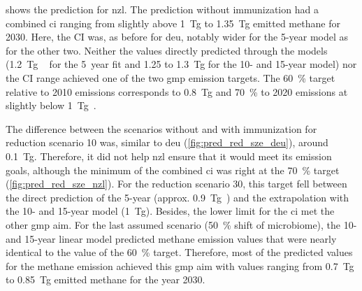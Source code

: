  shows the prediction for \acrshort{nzl}. The prediction without immunization had a combined \acrshort{ci} ranging from slightly above 1~Tg to 1.35~Tg emitted methane for 2030. Here, the CI was, as before for \acrshort{deu}, notably wider for the 5-year model as for the other two. Neither the values directly predicted through the models (1.2~Tg ~ for the 5~year fit and 1.25 to 1.3~Tg for the 10- and 15-year model) nor the CI range achieved one of the two \acrshort{gmp} emission targets. The 60~\% target relative to 2010 emissions corresponds to 0.8~Tg and 70~\% to 2020 emissions at slightly below 1~Tg~.

The difference between the scenarios without and with immunization for reduction scenario 10 was, similar to \acrshort{deu} (\cref{fig:pred_red_sze_deu}), around 0.1~Tg. Therefore, it did not help \acrshort{nzl} ensure that it would meet its emission goals, although the minimum of the combined \acrshort{ci} was right at the 70~\% target (\cref{fig:pred_red_sze_nzl}).
For the reduction scenario 30, this target fell between the direct prediction of the 5-year (approx. 0.9~Tg~) and the extrapolation with the 10- and 15-year model (1~Tg). Besides, the lower limit for the \acrlong{ci} met the other \acrshort{gmp} aim.
For the last assumed scenario (50~\% shift of microbiome), the 10- and 15-year linear model predicted methane emission values that were nearly identical to the value of the 60~\% target. Therefore, most of the predicted values for the methane emission achieved this \acrshort{gmp} aim with values ranging from 0.7~Tg to 0.85~Tg emitted methane for the year 2030.

